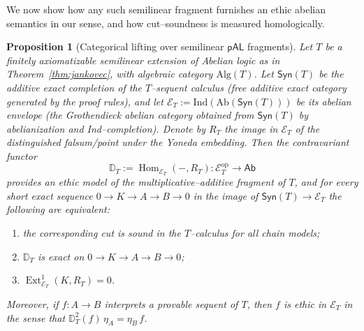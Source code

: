 \documentclass[12pt]{article}
\newcommand{\Syn}{\mathsf{Syn}}
\newcommand{\Alg}{\mathrm{Alg}}
\newcommand{\E}{\mathcal{E}}
\newcommand{\Ab}{\mathsf{Ab}}
\newcommand{\Hom}{\operatorname{Hom}}
\newcommand{\Ext}{\operatorname{Ext}}
\newcommand{\op}{\mathrm{op}}
\theoremstyle{plain}
\newtheorem{proposition}[theorem]{Proposition}
\theoremstyle{definition}
\theoremstyle{remark}
\numberwithin{equation}{section}
\begin{document}
We now show how any such semilinear fragment furnishes an ethic abelian semantics in our sense, and how cut–soundness is measured homologically.

\begin{proposition}[Categorical lifting over semilinear $\mathsf{pAL}$ fragments]\label{prop:cat-lift}
Let $T$ be a finitely axiomatizable semilinear extension of Abelian logic as in Theorem~\ref{thm:jankovec}, with algebraic category $\Alg(T)$. Let $\Syn(T)$ be the additive exact completion of the $T$–sequent calculus (free additive exact category generated by the proof rules), and let $\E_T:=\mathrm{Ind}(\mathrm{Ab}(\Syn(T)))$ be its abelian envelope (the Grothendieck abelian category obtained from $\Syn(T)$ by abelianization and Ind–completion). Denote by $R_T$ the image in $\E_T$ of the distinguished falsum/point under the Yoneda embedding. Then the contravariant functor
\[
\mathbb D_T:=\Hom_{\E_T}(-,R_T):\E_T^{\op}\longrightarrow \Ab
\]
provides an ethic model of the multiplicative–additive fragment of $T$, and for every short exact sequence $0\to K\to A\to B\to 0$ in the image of $\Syn(T)\to \E_T$ the following are equivalent:
\begin{enumerate}\itemsep4pt
\item[\textnormal{(i)}] the corresponding cut is sound in the $T$–calculus for all chain models;
\item[\textnormal{(ii)}] $\mathbb D_T$ is exact on $0\to K\to A\to B\to 0$;
\item[\textnormal{(iii)}] $\Ext^1_{\E_T}(K,R_T)=0$.
\end{enumerate}
Moreover, if $f:A\to B$ interprets a provable sequent of $T$, then $f$ is ethic in $\E_T$ in the sense that $\mathbb D_T^2(f)\,\eta_A=\eta_B\,f$.
\end{proposition}
\end{document}
